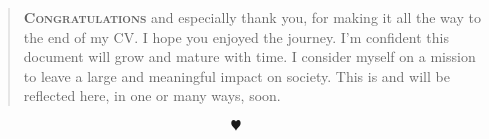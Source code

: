 \vspace{0.1cm}
\begin{quote}
  \textbf{\textsc{Congratulations}} and especially thank you, for making it all the way to the end of my CV. I hope you enjoyed the journey. I'm confident this document will grow and mature with time. I consider myself on a mission to leave a large and meaningful impact on society. This is and will be reflected here, in one or many ways, soon.
\end{quote}

$$\varheart$$



